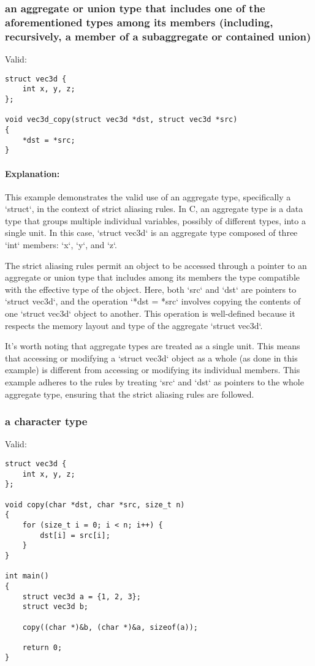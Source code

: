 \documentclass[12pt]{article}
\begin{document}
\subsubsection{an aggregate or union type that includes one of the aforementioned types among its members (including, recursively, a member of a subaggregate or contained union)}

Valid:
\begin{lstlisting}
struct vec3d {
    int x, y, z;
};

void vec3d_copy(struct vec3d *dst, struct vec3d *src)
{
    *dst = *src;
}
\end{lstlisting}

\paragraph{Explanation:}
This example demonstrates the valid use of an aggregate type, specifically a `struct`, in the context of strict aliasing rules. In C, an aggregate type is a data type that groups multiple individual variables, possibly of different types, into a single unit. In this case, `struct vec3d` is an aggregate type composed of three `int` members: `x`, `y`, and `z`.

The strict aliasing rules permit an object to be accessed through a pointer to an aggregate or union type that includes among its members the type compatible with the effective type of the object. Here, both `src` and `dst` are pointers to `struct vec3d`, and the operation `*dst = *src` involves copying the contents of one `struct vec3d` object to another. This operation is well-defined because it respects the memory layout and type of the aggregate `struct vec3d`.

It's worth noting that aggregate types are treated as a single unit. This means that accessing or modifying a `struct vec3d` object as a whole (as done in this example) is different from accessing or modifying its individual members. This example adheres to the rules by treating `src` and `dst` as pointers to the whole aggregate type, ensuring that the strict aliasing rules are followed.


\subsubsection{a character type}

Valid:

\begin{lstlisting}
struct vec3d {
    int x, y, z;
};

void copy(char *dst, char *src, size_t n)
{
    for (size_t i = 0; i < n; i++) {
        dst[i] = src[i];
    }
}

int main()
{
    struct vec3d a = {1, 2, 3};
    struct vec3d b;

    copy((char *)&b, (char *)&a, sizeof(a));

    return 0;
}
\end{lstlisting}
\end{document}
